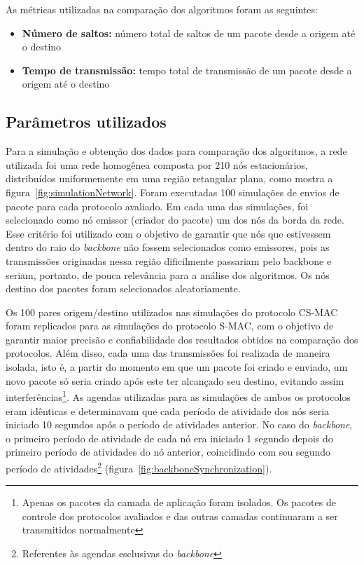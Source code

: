 As métricas utilizadas na comparação dos algoritmos foram as seguintes:

\begin{itemize}
\item \textbf{Número de saltos:} número total de saltos de um pacote desde a origem até o destino
\item \textbf{Tempo de transmissão:} tempo total de transmissão de um pacote desde a origem até o destino
\end{itemize} 

\subsection{Parâmetros utilizados}

Para a simulação e obtenção dos dados para comparação dos algoritmos, a rede utilizada foi uma rede homogênea composta por 210 nós estacionários, distribuídos uniformemente em uma região retangular plana, como mostra a figura~\ref{fig:simulationNetwork}. Foram executadas 100 simulações de envios de pacote para cada protocolo avaliado. Em cada uma das simulações, foi selecionado como nó emissor (criador do pacote) um dos nós da borda da rede. Esse critério foi utilizado com o objetivo de garantir que nós que estivessem dentro do raio do \emph{backbone} não fossem selecionados como emissores, pois as transmissões originadas nessa região dificilmente passariam pelo backbone e seriam, portanto, de pouca relevância para a análise dos algoritmos. Os nós destino dos pacotes foram selecionados aleatoriamente.

Os 100 pares origem/destino utilizados nas simulações do protocolo CS-MAC foram replicados para as simulações do protocolo S-MAC, com o objetivo de garantir maior precisão e confiabilidade dos resultados obtidos na comparação dos protocolos. Além disso, cada uma das transmissões foi realizada de maneira isolada, isto é, a partir do momento em que um pacote foi criado e enviado, um novo pacote só seria criado após este ter alcançado seu destino, evitando assim interferências\footnote{Apenas os pacotes da camada de aplicação foram isolados. Os pacotes de controle dos protocolos avaliados e das outras camadas continuaram a ser transmitidos normalmente}. As agendas utilizadas para as simulações de ambos os protocolos eram idênticas e determinavam que cada período de atividade dos nós seria iniciado 10 segundos após o período de atividades anterior. No caso do \emph{backbone}, o primeiro período de atividade de cada nó era iniciado 1 segundo depois do primeiro período de atividades do nó anterior, coincidindo com seu segundo período de atividades\footnote{Referentes às agendas esclusivas do \emph{backbone}} (figura~\ref{fig:backboneSynchronization}).   

